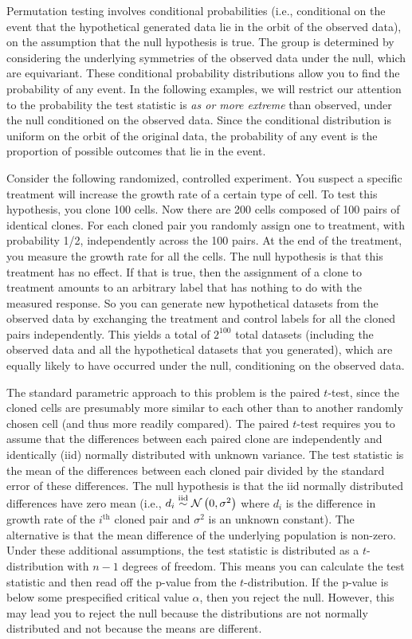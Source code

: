 Permutation testing involves conditional probabilities (i.e., conditional on
the event that the hypothetical generated data lie in the orbit of the observed
data), on the assumption that the null hypothesis is true.  The group is
determined by considering the underlying symmetries of the observed data under
the null, which are equivariant.  These  conditional probability distributions
allow you to find the probability of any event.  In the following examples, we
will restrict our attention to the probability the test statistic is \emph{as
or more extreme} than observed, under the null conditioned on the observed
data.  Since the conditional distribution is uniform on the orbit of the
original data, the probability of any event is the proportion of possible
outcomes that lie in the event.

\begin{example}[label=exa:cont] Consider the following randomized, controlled
experiment.  You suspect a specific treatment will increase the growth rate of
a certain type of cell.  To test this hypothesis, you clone 100 cells. Now
there are 200 cells composed of 100 pairs of identical clones. For each cloned
pair you randomly assign one to treatment, with probability 1/2, independently
across the 100 pairs.  At the end of the treatment, you measure the growth rate
for all the cells.  The null hypothesis is that this treatment has no effect.
If that is true, then the assignment of a clone to treatment amounts to an
arbitrary label that has nothing to do with the measured response.  So you can
generate new hypothetical datasets from the observed data by exchanging the
treatment and control labels for all the cloned pairs independently.  This
yields a total of $2^{100}$ total datasets (including the observed data and all
the hypothetical datasets that you generated), which are equally likely to have
occurred under the null, conditioning on the observed data.

The standard parametric approach to this problem is the paired $t$-test, since
the cloned cells are presumably more similar to each other than to another
randomly chosen cell (and thus more readily compared).  The paired $t$-test
requires you to assume that the differences between each paired clone are
independently and identically (iid) normally distributed with unknown variance.
The test statistic is the mean of the differences between each cloned pair
divided by the standard error of these differences.  The null hypothesis is
that the iid normally distributed differences have zero mean (i.e., $d_i \stackrel{\mathrm{iid}}{\sim}
\mathcal{N}\left(0,\sigma^2\right)$ where $d_i$ is the difference in growth rate of the
$i^{\text{th}}$ cloned pair and $\sigma^2$ is an unknown constant).  The
alternative is that the mean difference of the underlying population is
non-zero.  Under these additional assumptions, the test statistic is
distributed as a $t$-distribution with $n-1$ degrees of freedom.  This means you can
calculate the test statistic and then read off the p-value from the
$t$-distribution.  If the p-value is below some prespecified critical value
$\alpha$, then you reject the null.  However, this may lead you to reject the
null because the distributions are not normally distributed and not because the
means are different.


\end{example}
